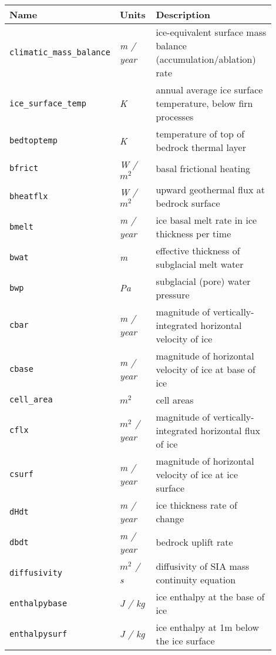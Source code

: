 \begin{table}[ht]
  \centering
  \begin{tabular}{p{0.15\linewidth}p{0.15\linewidth}p{0.6\linewidth}}
    \toprule
    \textbf{Name} & \textbf{Units} & \textbf{Description} \\
    \midrule
    \texttt{climatic_mass_balance} & \textsl{m / year} & ice-equivalent surface mass balance (accumulation/ablation) rate \\
    \texttt{ice_surface_temp} & \textsl{K} & annual average ice surface temperature, below firn processes \\
    \texttt{bedtoptemp} & \textsl{K} & temperature of top of bedrock thermal layer \\
    \texttt{bfrict} & \textsl{W  / $m^2$} &  basal frictional heating \\
    \texttt{bheatflx} & \textsl{W  / $m^2$} & upward geothermal flux at bedrock surface \\
    \texttt{bmelt} & \textsl{m / year} & ice basal melt rate in ice thickness per time \\
    \texttt{bwat} & \textsl{m} & effective thickness of subglacial melt water \\
    \texttt{bwp} & \textsl{Pa} & subglacial (pore) water pressure \\
    \texttt{cbar} & \textsl{m / year} &  magnitude of vertically-integrated horizontal velocity of ice \\
    \texttt{cbase} & \textsl{m / year} &  magnitude of horizontal velocity of ice at base of ice \\
    \texttt{cell_area} & \textsl{$m^{2}$} & cell areas \\
    \texttt{cflx} & \textsl{$m^{2}$ / year} &  magnitude of vertically-integrated horizontal flux of ice \\
    \texttt{csurf} & \textsl{m / year} &  magnitude of horizontal velocity of ice at ice surface \\
    \texttt{dHdt} & \textsl{m / year} &  ice thickness rate of change \\
    \texttt{dbdt} & \textsl{m / year} & bedrock uplift rate \\
    \texttt{diffusivity} & \textsl{$m^{2}$  / s} &  diffusivity of SIA mass continuity equation \\
    \texttt{enthalpybase} & \textsl{J  / kg} &  ice enthalpy at the base of ice \\
    \texttt{enthalpysurf} & \textsl{J  / kg} &  ice enthalpy at 1m below the ice surface \\

\end{tabular}
\end{table}
